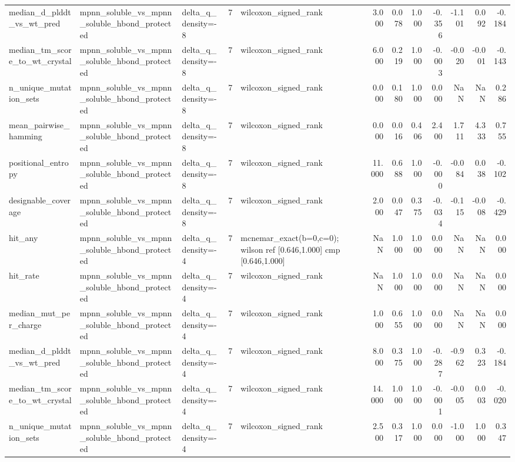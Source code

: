 \begin{table}
{\begin{tabular}{lllrlrrrrrrr}
median\_d\_plddt\_vs\_wt\_pred & mpnn\_soluble\_vs\_mpnn\_soluble\_hbond\_protected & delta\_q\_density=-8 & 7 & wilcoxon\_signed\_rank & 3.000 & 0.078 & 1.000 & -0.356 & -1.101 & 0.092 & -0.184 \\
median\_tm\_score\_to\_wt\_crystal & mpnn\_soluble\_vs\_mpnn\_soluble\_hbond\_protected & delta\_q\_density=-8 & 7 & wilcoxon\_signed\_rank & 6.000 & 0.219 & 1.000 & -0.003 & -0.020 & -0.001 & -0.143 \\
n\_unique\_mutation\_sets & mpnn\_soluble\_vs\_mpnn\_soluble\_hbond\_protected & delta\_q\_density=-8 & 7 & wilcoxon\_signed\_rank & 0.000 & 0.180 & 1.000 & 0.000 & NaN & NaN & 0.286 \\
mean\_pairwise\_hamming & mpnn\_soluble\_vs\_mpnn\_soluble\_hbond\_protected & delta\_q\_density=-8 & 7 & wilcoxon\_signed\_rank & 0.000 & 0.016 & 0.406 & 2.400 & 1.711 & 4.333 & 0.755 \\
positional\_entropy & mpnn\_soluble\_vs\_mpnn\_soluble\_hbond\_protected & delta\_q\_density=-8 & 7 & wilcoxon\_signed\_rank & 11.000 & 0.688 & 1.000 & -0.000 & -0.084 & 0.038 & -0.102 \\
designable\_coverage & mpnn\_soluble\_vs\_mpnn\_soluble\_hbond\_protected & delta\_q\_density=-8 & 7 & wilcoxon\_signed\_rank & 2.000 & 0.047 & 0.375 & -0.034 & -0.115 & -0.008 & -0.429 \\
hit\_any & mpnn\_soluble\_vs\_mpnn\_soluble\_hbond\_protected & delta\_q\_density=-4 & 7 & mcnemar\_exact(b=0,c=0); wilson ref [0.646,1.000] cmp [0.646,1.000] & NaN & 1.000 & 1.000 & 0.000 & NaN & NaN & 0.000 \\
hit\_rate & mpnn\_soluble\_vs\_mpnn\_soluble\_hbond\_protected & delta\_q\_density=-4 & 7 & wilcoxon\_signed\_rank & NaN & 1.000 & 1.000 & 0.000 & NaN & NaN & 0.000 \\
median\_mut\_per\_charge & mpnn\_soluble\_vs\_mpnn\_soluble\_hbond\_protected & delta\_q\_density=-4 & 7 & wilcoxon\_signed\_rank & 1.000 & 0.655 & 1.000 & 0.000 & NaN & NaN & 0.000 \\
median\_d\_plddt\_vs\_wt\_pred & mpnn\_soluble\_vs\_mpnn\_soluble\_hbond\_protected & delta\_q\_density=-4 & 7 & wilcoxon\_signed\_rank & 8.000 & 0.375 & 1.000 & -0.287 & -0.962 & 0.323 & -0.184 \\
median\_tm\_score\_to\_wt\_crystal & mpnn\_soluble\_vs\_mpnn\_soluble\_hbond\_protected & delta\_q\_density=-4 & 7 & wilcoxon\_signed\_rank & 14.000 & 1.000 & 1.000 & -0.001 & -0.005 & 0.003 & -0.020 \\
n\_unique\_mutation\_sets & mpnn\_soluble\_vs\_mpnn\_soluble\_hbond\_protected & delta\_q\_density=-4 & 7 & wilcoxon\_signed\_rank & 2.500 & 0.317 & 1.000 & 0.000 & -1.000 & 1.000 & 0.347 \\

\end{tabular}}
\end{table}
